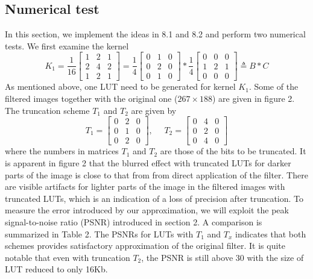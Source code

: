 \documentclass[12pt]{amsart}
\theoremstyle{definition}
\theoremstyle{remark}
\numberwithin{thm}{section}
\begin{document}
\subsection{Numerical test}
In this section, we implement the ideas in 8.1 and 8.2 and perform two numerical tests. We first examine the kernel
$$
K_1=\frac{1}{16}
\begin{bmatrix}
1 & 2 & 1\\
2 & 4 & 2\\
1 & 2 & 1
\end{bmatrix}
=
\frac{1}{4}
\begin{bmatrix}
0 & 1 & 0\\
0 & 2 & 0\\
0 & 1 & 0
\end{bmatrix}*\frac{1}{4}
\begin{bmatrix}
0 & 0 & 0\\
1 & 2 & 1\\
0 & 0 & 0
\end{bmatrix}\triangleq B*C
$$
As mentioned above, one LUT need to be generated for kernel $K_1$. Some of the filtered images together with the original one ($267\times 188$) are given in figure 2. The truncation scheme $T_1$ and $T_2$ are given by 
$$
T_1=
\begin{bmatrix}
0 & 2 & 0\\
0 & 1 & 0\\
0 & 2 & 0
\end{bmatrix}
,\ \ \ \ \ \ T_2=
\begin{bmatrix}
0 & 4 & 0\\
0 & 2 & 0\\
0 & 4 & 0
\end{bmatrix}
$$
where the numbers in matrices $T_1$ and $T_2$ are those of the bits to be truncated. It is apparent in figure 2 that the blurred effect with truncated LUTs for darker parts of the image is close to that from from direct application of the filter. There are visible artifacts for lighter parts of the image in the filtered images with truncated LUTs, which is an indication of a loss of precision after truncation. To measure the error introduced by our approximation, we will exploit the peak signal-to-noise ratio (PSNR) introduced in section 2. A comparison is summarized in Table 2. The PSNRs for LUTs with $T_1$ and $T_x$ indicates that both schemes provides satisfactory approximation of the original filter. It is quite notable that even with truncation $T_2$, the PSNR is still above 30 with the size of LUT reduced to only 16Kb. 
\end{document}
